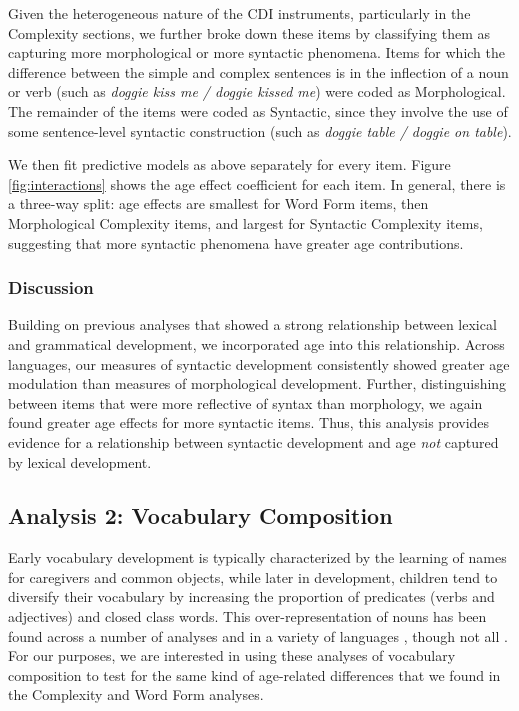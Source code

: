 \documentclass[10pt,letterpaper]{article}
\begin{document}
Given the heterogeneous nature of the CDI instruments, particularly in the Complexity sections, we further broke down these items by classifying them as capturing more morphological or more syntactic phenomena. Items for which the difference between the simple and complex sentences is in the inflection of a noun or verb (such as \emph{doggie kiss me / doggie kissed me}) were coded as Morphological. The remainder of the items were coded as Syntactic, since they involve the use of some sentence-level syntactic construction (such as \emph{doggie table / doggie on table}).

We then fit predictive models as above separately for every item. Figure \ref{fig:interactions} shows the age effect coefficient for each item. In general, there is a three-way split: age effects are smallest for Word Form items, then Morphological Complexity items, and largest for Syntactic Complexity items, suggesting that more syntactic phenomena have greater age contributions. 

\vfill
\subsubsection{Discussion}

Building on previous analyses that showed a strong relationship between lexical and grammatical development, we incorporated age into this relationship. Across languages, our measures of syntactic development consistently showed greater age modulation than measures of morphological development. Further, distinguishing between items that were more reflective of syntax than morphology, we again found greater age effects for more syntactic items. Thus, this analysis provides evidence for a relationship between syntactic development and age \emph{not} captured by lexical development.

\subsection{Analysis 2: Vocabulary Composition}

Early vocabulary development is typically characterized by the learning of names for caregivers and common objects, while later in development, children tend to diversify their vocabulary by increasing the proportion of predicates (verbs and adjectives) and closed class words. This over-representation of nouns has been found across a number of analyses and in a variety of languages \cite{bates1994,caselli1995,bornstein2004}, though not all \cite{tardif1996,choi1995}.
For our purposes, we are interested in using these analyses of vocabulary composition to test for the same kind of age-related differences that we found in the Complexity and Word Form analyses. 
\end{document}

